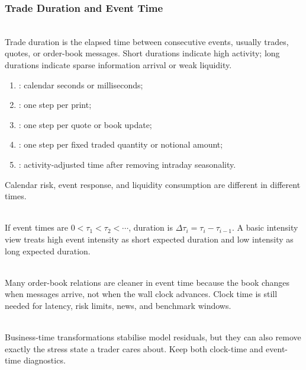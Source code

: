 \subsubsection{Trade Duration and Event Time}

\begin{definition} \\
Trade duration is the elapsed time between consecutive events, usually trades, quotes, or order-book messages. Short durations indicate high activity; long durations indicate sparse information arrival or weak liquidity.
\end{definition}

\begin{taxonomy} 
\begin{enumerate}[label=\roman*.]
\setlength{\itemsep}{0pt}
\item {}: calendar seconds or milliseconds;
\item {}: one step per print;
\item {}: one step per quote or book update;
\item {}: one step per fixed traded quantity or notional amount;
\item {}: activity-adjusted time after removing intraday seasonality.
\end{enumerate}
Calendar risk, event response, and liquidity consumption are different in different times.
\end{taxonomy}

\begin{model} \\
If event times are $0<\tau_1<\tau_2<\cdots$, duration is $\Delta \tau_i=\tau_i-\tau_{i-1}$. A basic intensity view treats high event intensity as short expected duration and low intensity as long expected duration.
\end{model}

\begin{principle} \\
Many order-book relations are cleaner in event time because the book changes when messages arrive, not when the wall clock advances. Clock time is still needed for latency, risk limits, news, and benchmark windows.
\end{principle}

\begin{caveat} \\
Business-time transformations stabilise model residuals, but they can also remove exactly the stress state a trader cares about. Keep both clock-time and event-time diagnostics.
\end{caveat}
